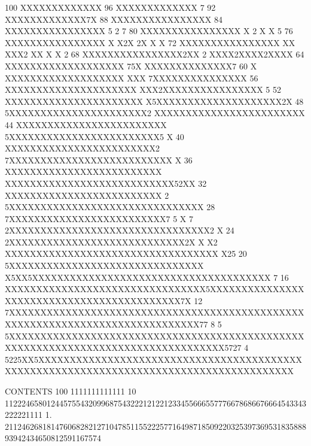 \begin{Listing}
      100                              XXXXXXXXXXXXX
       96                              XXXXXXXXXXXXX 7
       92                              XXXXXXXXXXXXX7X
       88                             XXXXXXXXXXXXXXXX
       84                             XXXXXXXXXXXXXXXX 5                              2 7
       80                             XXXXXXXXXXXXXXXX X                        2     X X  5
       76                             XXXXXXXXXXXXXXXX X                        X2X  2X X  X
       72                             XXXXXXXXXXXXXXXX XX                       XXX2 XX X  X 2
       68                             XXXXXXXXXXXXXXXX2XX                    2  XXXX2XXXX2XXXX
       64                             XXXXXXXXXXXXXXXXXXX                  75X  XXXXXXXXXXXXXX7
       60                           X XXXXXXXXXXXXXXXXXXX                  XXX 7XXXXXXXXXXXXXXX
       56                           XXXXXXXXXXXXXXXXXXXXX                  XXX2XXXXXXXXXXXXXXXX 5
       52                           XXXXXXXXXXXXXXXXXXXXXX               X5XXXXXXXXXXXXXXXXXXXX2X
       48                          5XXXXXXXXXXXXXXXXXXXXXX2              XXXXXXXXXXXXXXXXXXXXXXXX
       44                          XXXXXXXXXXXXXXXXXXXXXXXX             5XXXXXXXXXXXXXXXXXXXXXXXX5  X
       40                          XXXXXXXXXXXXXXXXXXXXXXXX2           7XXXXXXXXXXXXXXXXXXXXXXXXXX  X
       36                          XXXXXXXXXXXXXXXXXXXXXXXXX           XXXXXXXXXXXXXXXXXXXXXXXXXXX52XX
       32                          XXXXXXXXXXXXXXXXXXXXXXXXX    2     5XXXXXXXXXXXXXXXXXXXXXXXXXXXXXXX
       28                         7XXXXXXXXXXXXXXXXXXXXXXXXX7 5 X 7  2XXXXXXXXXXXXXXXXXXXXXXXXXXXXXXXX2 X
       24                       2XXXXXXXXXXXXXXXXXXXXXXXXXXXX2X X X2 XXXXXXXXXXXXXXXXXXXXXXXXXXXXXXXXXX X25
       20                      5XXXXXXXXXXXXXXXXXXXXXXXXXXXXXXX X5XX5XXXXXXXXXXXXXXXXXXXXXXXXXXXXXXXXXXXXXX 7
       16                      XXXXXXXXXXXXXXXXXXXXXXXXXXXXXXXX5XXXXXXXXXXXXXXXXXXXXXXXXXXXXXXXXXXXXXXXXXXX7X
       12                     7XXXXXXXXXXXXXXXXXXXXXXXXXXXXXXXXXXXXXXXXXXXXXXXXXXXXXXXXXXXXXXXXXXXXXXXXXXXXXX77
        8                 5 5XXXXXXXXXXXXXXXXXXXXXXXXXXXXXXXXXXXXXXXXXXXXXXXXXXXXXXXXXXXXXXXXXXXXXXXXXXXXXXXXXX5727
        4            5225XX5XXXXXXXXXXXXXXXXXXXXXXXXXXXXXXXXXXXXXXXXXXXXXXXXXXXXXXXXXXXXXXXXXXXXXXXXXXXXXXXXXXXXXXXX
 
 CONTENTS 100                          1111111111111                                                                
           10                 112224658012445755432099687543222121221233455666557776678686676664543343222221111     
            1.       21124626818147606828212710478511552225771649871850922032539736953183588893942434650812591167574
 

\end{Listing}
